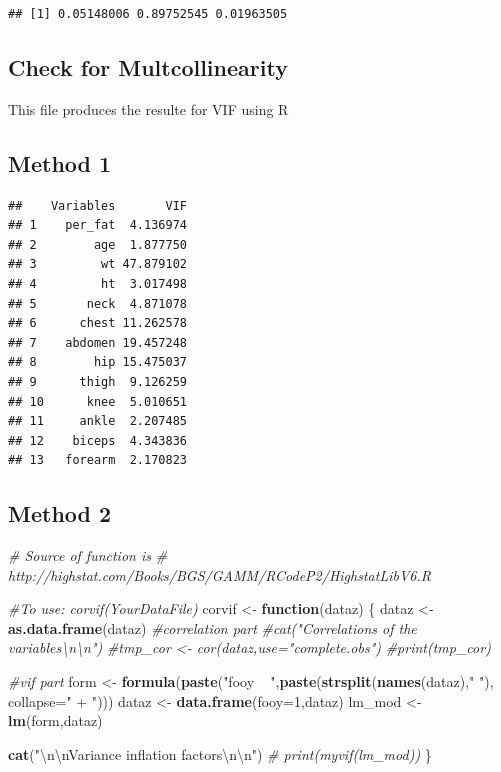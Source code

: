 \documentclass[]{article}
\newenvironment{Shaded}{\begin{snugshade}}{\end{snugshade}}
\newcommand{\KeywordTok}[1]{\textcolor[rgb]{0.13,0.29,0.53}{\textbf{#1}}}
\newcommand{\DataTypeTok}[1]{\textcolor[rgb]{0.13,0.29,0.53}{#1}}
\newcommand{\DecValTok}[1]{\textcolor[rgb]{0.00,0.00,0.81}{#1}}
\newcommand{\CharTok}[1]{\textcolor[rgb]{0.31,0.60,0.02}{#1}}
\newcommand{\StringTok}[1]{\textcolor[rgb]{0.31,0.60,0.02}{#1}}
\newcommand{\CommentTok}[1]{\textcolor[rgb]{0.56,0.35,0.01}{\textit{#1}}}
\newcommand{\ControlFlowTok}[1]{\textcolor[rgb]{0.13,0.29,0.53}{\textbf{#1}}}
\newcommand{\NormalTok}[1]{#1}
\begin{document}
\begin{verbatim}
## [1] 0.05148006 0.89752545 0.01963505
\end{verbatim}

\subsection{Check for
Multcollinearity}\label{check-for-multcollinearity}

This file produces the resulte for VIF using R

\subsection{Method 1}\label{method-1}

\begin{verbatim}
##    Variables       VIF
## 1    per_fat  4.136974
## 2        age  1.877750
## 3         wt 47.879102
## 4         ht  3.017498
## 5       neck  4.871078
## 6      chest 11.262578
## 7    abdomen 19.457248
## 8        hip 15.475037
## 9      thigh  9.126259
## 10      knee  5.010651
## 11     ankle  2.207485
## 12    biceps  4.343836
## 13   forearm  2.170823
\end{verbatim}

\subsection{Method 2}\label{method-2}

\begin{Shaded}
\begin{Highlighting}[]
\CommentTok{# Source of function is }
\CommentTok{# http://highstat.com/Books/BGS/GAMM/RCodeP2/HighstatLibV6.R}

\CommentTok{#To use:  corvif(YourDataFile)}
\NormalTok{corvif <-}\StringTok{ }\ControlFlowTok{function}\NormalTok{(dataz) \{}
\NormalTok{  dataz <-}\StringTok{ }\KeywordTok{as.data.frame}\NormalTok{(dataz)}
  \CommentTok{#correlation part}
  \CommentTok{#cat("Correlations of the variables\textbackslash{}n\textbackslash{}n")}
  \CommentTok{#tmp_cor <- cor(dataz,use="complete.obs")}
  \CommentTok{#print(tmp_cor)}
  
  \CommentTok{#vif part}
\NormalTok{  form    <-}\StringTok{ }\KeywordTok{formula}\NormalTok{(}\KeywordTok{paste}\NormalTok{(}\StringTok{"fooy ~ "}\NormalTok{,}\KeywordTok{paste}\NormalTok{(}\KeywordTok{strsplit}\NormalTok{(}\KeywordTok{names}\NormalTok{(dataz),}\StringTok{" "}\NormalTok{),}
                            \DataTypeTok{collapse=}\StringTok{" + "}\NormalTok{)))}
\NormalTok{  dataz   <-}\StringTok{ }\KeywordTok{data.frame}\NormalTok{(}\DataTypeTok{fooy=}\DecValTok{1}\NormalTok{,dataz)}
\NormalTok{  lm_mod  <-}\StringTok{ }\KeywordTok{lm}\NormalTok{(form,dataz)}
  
  \KeywordTok{cat}\NormalTok{(}\StringTok{"}\CharTok{\textbackslash{}n\textbackslash{}n}\StringTok{Variance inflation factors}\CharTok{\textbackslash{}n\textbackslash{}n}\StringTok{"}\NormalTok{)}
\CommentTok{#  print(myvif(lm_mod))}
\NormalTok{\}}
\end{Highlighting}
\end{Shaded}
\end{document}
